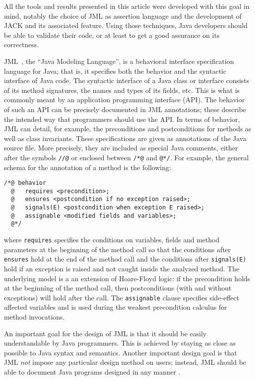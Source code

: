 All the tools and results presented in this article were developed
with this goal in mind, notably the choice of JML as assertion
language and the development of JACK and its associated feature.
Using those techniques, Java developers should be able to validate
their code, or at least to get a good assurance on its correctness.

JML~\cite{Leavens-Baker-Ruby99b,Leavens-Baker-Ruby03}, the ``Java
Modeling Language'', is a behavioral interface specification language
for Java; that is, it specifies both the behavior and the syntactic
interface of Java code.  The syntactic interface of a Java class or
interface consists of its method signatures, the names and types of
its fields, etc.  This is what is commonly meant by an application
programming interface (API).  The behavior of such an API can be
precisely documented in JML annotations; these describe the intended
way that programmers should use the API.  In terms of behavior, JML
can detail, for example, the preconditions and postconditions for
methods as well as class invariants. These specifications are given as
annotations of the Java source file. More precisely, they are included
as special Java comments, either after the symbols \lstinline!//@! or
enclosed between \lstinline!/*@! and
\lstinline[basicstyle=\normalfont\ttfamily\small\sl]!@*/!. For example,
the general schema for the annotation of a method is the following:
\begin{lstlisting}
/*@ behavior
  @   requires <precondition>;
  @   ensures <postcondition if no exception raised>;
  @   signals(E) <postcondition when exception E raised>;
  @   assignable <modified fields and variables>;
  @*/
\end{lstlisting}
where \lstinline!requires! specifies the conditions on variables, fields
and method parameters at the beginning of the method call so that the
conditions after \lstinline!ensures! hold at the end of the method
call and the conditions after \lstinline!signals(E)! hold if an
exception is raised and not caught inside the analyzed method.  The
underlying model is a an extension of Hoare-Floyd logic: if the
precondition holds at the beginning of the method call, then
postconditions (with and without exceptions) will hold after the
call. The \lstinline!assignable! clause specifies side-effect affected
variables and is used during the weakest precondition calculus for
method invocations.

An important goal for the design of JML is that it should be easily
understandable by Java programmers. This is achieved by staying as
close as possible to Java syntax and semantics.  Another important
design goal is that JML {\em not} impose any particular design method
on users; instead, JML should be able to document Java programs
designed in any manner \cite{Leavens-Baker-Ruby03}.

